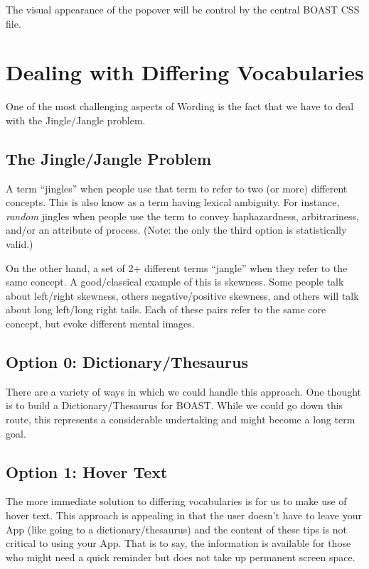 \documentclass[
]{book}
\begin{document}
The visual appearance of the popover will be control by the central BOAST CSS file.

\hypertarget{dealing-with-differing-vocabularies}{%
\section{Dealing with Differing Vocabularies}\label{dealing-with-differing-vocabularies}}

One of the most challenging aspects of Wording is the fact that we have to deal with the Jingle/Jangle problem.

\hypertarget{jingleJangle}{%
\subsection{The Jingle/Jangle Problem}\label{jingleJangle}}

A term ``jingles'' when people use that term to refer to two (or more) different concepts. This is also know as a term having lexical ambiguity. For instance, \emph{random} jingles when people use the term to convey haphazardness, arbitrariness, and/or an attribute of process. (Note: the only the third option is statistically valid.)

On the other hand, a set of 2+ different terms ``jangle'' when they refer to the same concept. A good/classical example of this is skewness. Some people talk about left/right skewness, others negative/positive skewness, and others will talk about long left/long right tails. Each of these pairs refer to the same core concept, but evoke different mental images.

\hypertarget{option-0-dictionarythesaurus}{%
\subsection{Option 0: Dictionary/Thesaurus}\label{option-0-dictionarythesaurus}}

There are a variety of ways in which we could handle this approach. One thought is to build a Dictionary/Thesaurus for BOAST. While we could go down this route, this represents a considerable undertaking and might become a long term goal.

\hypertarget{hovertext}{%
\subsection{Option 1: Hover Text}\label{hovertext}}

The more immediate solution to differing vocabularies is for us to make use of hover text. This approach is appealing in that the user doesn't have to leave your App (like going to a dictionary/thesaurus) and the content of these tips is not critical to using your App. That is to say, the information is available for those who might need a quick reminder but does not take up permanent screen space.
\end{document}
